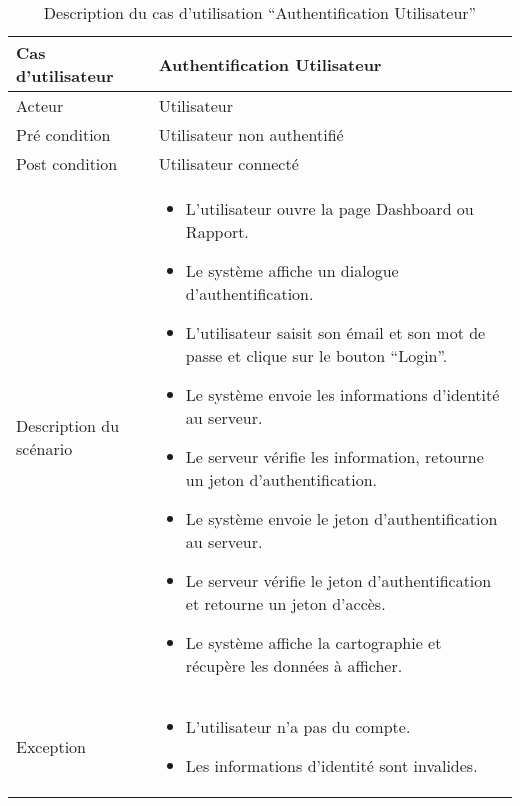 \begin{table}[H]
    \centering
    \begin{tabular}{| p{3cm} | l |}
        \hline
        Cas d'utilisateur & Authentification Utilisateur \\ \hline
        Acteur & Utilisateur \\ \hline
        Pré condition & Utilisateur non authentifié \\ \hline
        Post condition & Utilisateur connecté \\ \hline
        Description du scénario &
        \begin{minipage}{11cm}
            \vspace*{0.2cm}
            \begin{itemize}
                \item L'utilisateur ouvre la page Dashboard ou Rapport.
                \item Le système affiche un dialogue d'authentification.
                \item L'utilisateur saisit son émail et son mot de passe et clique sur le bouton ``Login''.
                \item Le système envoie les informations d'identité au serveur.
                \item Le serveur vérifie les information, retourne un jeton d'authentification.
                \item Le système envoie le jeton d'authentification au serveur.
                \item Le serveur vérifie le jeton d'authentification et retourne un jeton d'accès.
                \item Le système affiche la cartographie et récupère les données à afficher.
            \end{itemize}
            \vspace*{0.2cm}
        \end{minipage} \\ \hline
        Exception & \begin{minipage}{11cm}
            \vspace*{0.2cm}
            \begin{itemize}
                \item L'utilisateur n'a pas du compte.
                \item Les informations d'identité sont invalides.
            \end{itemize}
            \vspace*{0.1cm}
        \end{minipage}
        \\ \hline
    \end{tabular}
    \caption{Description du cas d'utilisation ``Authentification Utilisateur''}
\end{table}

